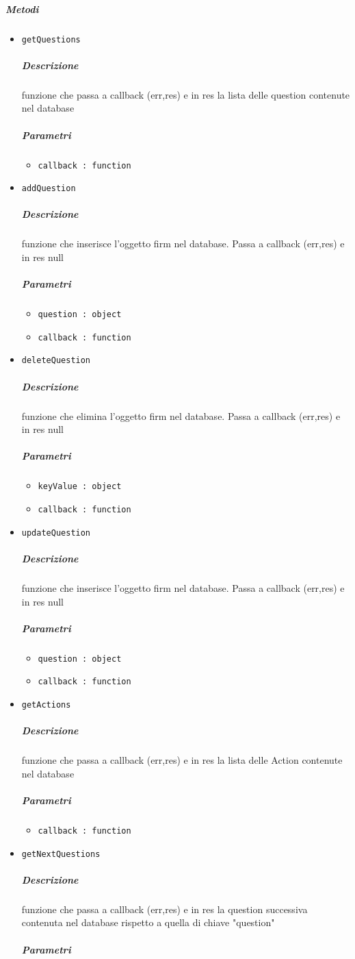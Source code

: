\documentclass[../ManualeSviluppatore_v2.0.0.tex]{subfiles}
\begin{document}
\subparagraph{Metodi}\begin{itemize}
\item \texttt{getQuestions}
\subparagraph{Descrizione}funzione che passa a callback (err,res) e in res la lista delle question contenute nel database
\subparagraph{Parametri}
\begin{itemize}
	\item \texttt{callback : function}
\end{itemize}
\item \texttt{addQuestion}
\subparagraph{Descrizione}funzione che inserisce l'oggetto firm nel database. Passa a callback (err,res) e in res null
\subparagraph{Parametri}
\begin{itemize}
	\item \texttt{question : object}
	\item \texttt{callback : function}
\end{itemize}
\item \texttt{deleteQuestion}
\subparagraph{Descrizione}funzione che elimina l'oggetto firm nel database. Passa a callback (err,res) e in res null
\subparagraph{Parametri}
\begin{itemize}
	\item \texttt{keyValue : object}
	\item \texttt{callback : function}
\end{itemize}
\item \texttt{updateQuestion}
\subparagraph{Descrizione}funzione che inserisce l'oggetto firm nel database. Passa a callback (err,res) e in res null
\subparagraph{Parametri}
\begin{itemize}
	\item \texttt{question : object}
	\item \texttt{callback : function}
\end{itemize}
\item \texttt{getActions}
\subparagraph{Descrizione}funzione che passa a callback (err,res) e in res la lista delle Action contenute nel database
\subparagraph{Parametri}
\begin{itemize}
	\item \texttt{callback : function}
\end{itemize}
\item \texttt{getNextQuestions}
\subparagraph{Descrizione}funzione che passa a callback (err,res) e in res la  question successiva contenuta nel database rispetto a quella di chiave "question"
\subparagraph{Parametri}
\begin{itemize}

\end{itemize}
\end{itemize}
\end{document}
